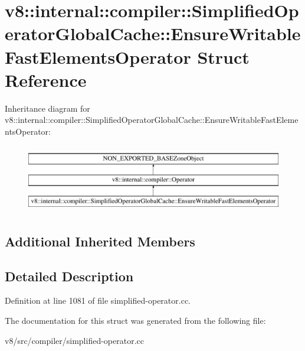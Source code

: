 \hypertarget{structv8_1_1internal_1_1compiler_1_1SimplifiedOperatorGlobalCache_1_1EnsureWritableFastElementsOperator}{}\section{v8\+:\+:internal\+:\+:compiler\+:\+:Simplified\+Operator\+Global\+Cache\+:\+:Ensure\+Writable\+Fast\+Elements\+Operator Struct Reference}
\label{structv8_1_1internal_1_1compiler_1_1SimplifiedOperatorGlobalCache_1_1EnsureWritableFastElementsOperator}
Inheritance diagram for v8\+:\+:internal\+:\+:compiler\+:\+:Simplified\+Operator\+Global\+Cache\+:\+:Ensure\+Writable\+Fast\+Elements\+Operator\+:\begin{figure}[H]
\begin{center}
\leavevmode
\includegraphics[height=3.000000cm]{structv8_1_1internal_1_1compiler_1_1SimplifiedOperatorGlobalCache_1_1EnsureWritableFastElementsOperator}
\end{center}
\end{figure}
\subsection*{Additional Inherited Members}


\subsection{Detailed Description}


Definition at line 1081 of file simplified-\/operator.\+cc.



The documentation for this struct was generated from the following file\+:\begin{DoxyCompactItemize}
\item 
v8/src/compiler/simplified-\/operator.\+cc\end{DoxyCompactItemize}
